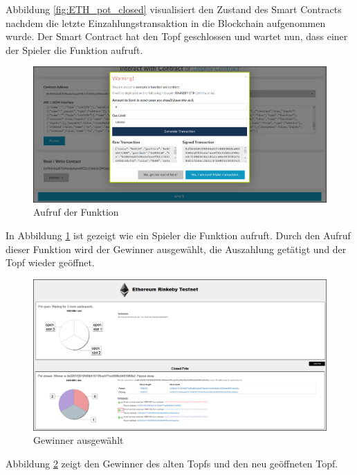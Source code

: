 Abbildung \ref{fig:ETH_pot_closed} visualisiert den Zustand des Smart Contracts nachdem die letzte Einzahlungstransaktion in die Blockchain aufgenommen wurde. Der Smart Contract hat den Topf geschlossen und wartet nun, dass einer der Spieler die  Funktion aufruft.

\begin{figure}[H]
\centering
\includegraphics[width=1\linewidth]{Figures/eth_gui/ETH_wallet_payout}
\decoRule
\caption{Aufruf der  Funktion}
\label{fig:ETH_wallet_payout}
\end{figure}

In Abbildung \ref{fig:ETH_wallet_payout} ist gezeigt wie ein Spieler die   Funktion aufruft. Durch den Aufruf dieser Funktion wird der Gewinner ausgewählt, die Auszahlung getätigt und der Topf wieder geöffnet.

\begin{figure}[H]
\centering
\includegraphics[width=1\linewidth]{Figures/eth_gui/ETH_pot_finished}
\decoRule
\caption{Gewinner ausgewählt}
\label{fig:ETH_pot_finished}
\end{figure}

Abbildung \ref{fig:ETH_pot_finished} zeigt den Gewinner des alten Topfs und den neu geöffneten Topf.